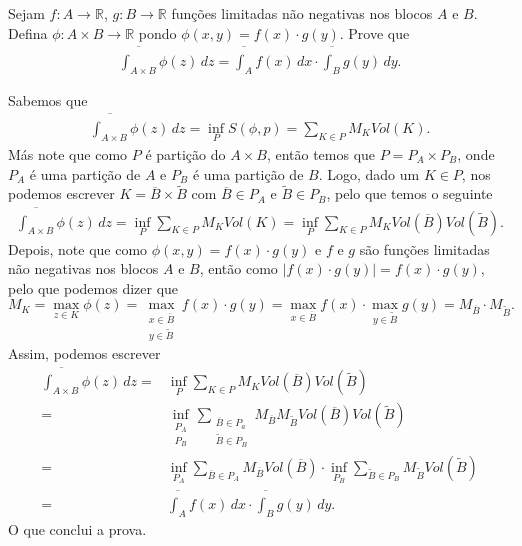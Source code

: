 \begin{homeworkProblem}[Seção 1-3]
  Sejam $f:A\to\mathbb{R}$, $g:B\to\mathbb{R}$ funções limitadas não negativas nos blocos $A$ e $B$. Defina $\phi:A\times B\to\mathbb{R}$ pondo $\phi(x,y)=f(x)\cdot g(y)$. Prove que
  \begin{align*}
    \overline{\int_{A\times B}}\phi(z)\,dz=\overline{\int_{A}}f(x)\,dx\cdot\overline{\int_{B}}g(y)\,dy.
  \end{align*}
  \begin{solution}
    Sabemos que
    \begin{align*}
      \overline{\int_{A\times B}}\phi(z)\,dz=\inf_{P}S(\phi,p)=\sum_{K\in P}M_{K}Vol(K).
    \end{align*}
    Más note que como $P$ é partição do $A\times B$, então temos que $P=P_A\times P_B$, onde $P_A$ é uma partição de $A$ e $P_{B}$ é uma partição de $B$. Logo, dado um $K\in P$, nos podemos escrever $K=\overline{B}\times\tilde{B}$ com $\overline{B}\in P_{A}$ e $\tilde{B}\in P_{B}$, pelo que temos o seguinte
    \begin{align*}
      \overline{\int_{A\times B}}\phi(z)\,dz=\inf_{P}\sum_{K\in P}M_{K}Vol(K)=\inf_{P}\sum_{K\in P}M_{K}Vol(\overline{B})Vol(\tilde{B}). 
    \end{align*}
    Depois, note que como $\phi(x,y)=f(x)\cdot g(y)$ e $f$ e $g$ são funções limitadas não negativas nos blocos $A$ e $B$, então como $|f(x)\cdot g(y)|=f(x)\cdot g(y)$, pelo que podemos dizer que  
    $$M_{K}=\max_{z\in K}\phi(z)=\max_{\substack{x\in\overline{B}\\y\in\tilde{B}}}f(x)\cdot g(y)=\max_{x\in\overline{B}}f(x)\cdot \max_{y\in\tilde{B}}g(y)=M_{\overline{B}}\cdot M_{\tilde{{B}}}.$$
    Assim, podemos escrever
    \begin{align*} 
      \overline{\int_{A\times B}}\phi(z)\,dz=&\inf_{P}\sum_{K\in P}M_{K}Vol(\overline{B})Vol(\tilde{B})\\
      =&\inf_{\substack{P_A\\ P_B}}\sum_{\substack{\overline{B}\in P_a\\ \tilde{B}\in P_{B}}}M_{\overline{B}}M_{\tilde{B}}Vol(\overline{B})Vol(\tilde{B})\\
      =&\inf_{P_A}\sum_{\overline{B}\in P_A}M_{\overline{B}}Vol(\overline{B})\cdot\inf_{P_B}\sum_{\tilde{B}\in P_B}M_{\tilde{B}}Vol(\tilde{B})\\
      =&\overline{\int_{A}}f(x)\,dx\cdot\overline{\int_{B}}g(y)\,dy.
    \end{align*}
    O que conclui a prova.
  \end{solution}
\end{homeworkProblem}
